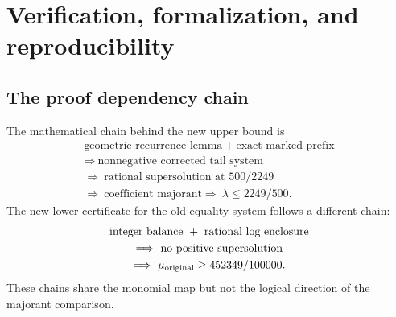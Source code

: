 \documentclass[11pt,a4paper]{article}
\theoremstyle{definition}
\theoremstyle{remark}
\begin{document}
\section{Verification, formalization, and reproducibility}
\label{kfp:sec:verification}

\subsection{The proof dependency chain}
The mathematical chain behind the new upper bound is
\[
\begin{gathered}
 \text{geometric recurrence lemma}
 \ +\ \text{exact marked prefix}\\
 \Longrightarrow\ \text{nonnegative corrected tail system}\\
 \Longrightarrow\ \text{rational supersolution at }500/2249\\
 \Longrightarrow\ \text{coefficient majorant}
 \Longrightarrow\ \lambda\leq2249/500.
\end{gathered}
\]
The new lower certificate for the old equality system follows a different
chain:
\[
\begin{gathered}
 \text{integer balance}\ +\ \text{rational log enclosure}\\
 \Longrightarrow\ \text{no positive supersolution}\\
 \Longrightarrow\ \mu_{\rm original}\geq452349/100000.
\end{gathered}
\]
These chains share the monomial map but not the logical direction of the
majorant comparison.
\end{document}
